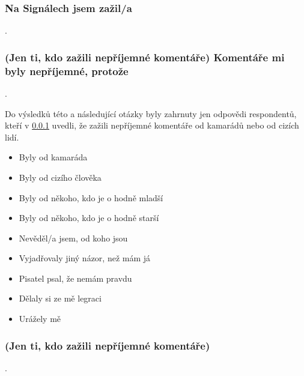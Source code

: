 \subsubsection{Na Signálech jsem zažil/a}\label{sec:neprijemneco}

\qtype \pickMultiple.


\subsubsection{(Jen ti, kdo zažili nepříjemné komentáře) Komentáře mi byly nepříjemné, protože}

\qtype \pickMultiple \withOther.

Do výsledků této a následující otázky byly zahrnuty
jen odpovědi respondentů,
kteří v \ref{sec:neprijemneco} uvedli, že zažili nepříjemné komentáře
od kamarádů nebo od cizích lidí.

\begin{itemize}
\item Byly od kamaráda
\item Byly od cizího člověka
\item Byly od někoho, kdo je o hodně mladší
\item Byly od někoho, kdo je o hodně starší
\item Nevěděl/a jsem, od koho jsou
\item Vyjadřovaly jiný názor, než mám já
\item Pisatel psal, že nemám pravdu
\item Dělaly si ze mě legraci
\item Urážely mě
\end{itemize}


\subsubsection{(Jen ti, kdo zažili nepříjemné komentáře)}

\qtype \pickOne. \series




